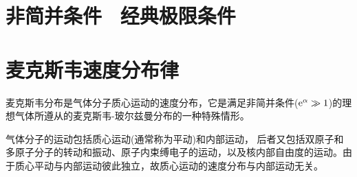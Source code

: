 \documentclass[12pt,a4paper]{article}
\begin{document}
\section{非简并条件 ~经典极限条件}






































\section{麦克斯韦速度分布律}
麦克斯韦分布是气体分子质心运动的速度分布，它是满足非简并条件(${\rm e}^\alpha \gg 1$)的理想气体所遵从的麦克斯韦-玻尔兹曼分布的一种特殊情形。

气体分子的运动包括质心运动(通常称为平动)和内部运动， 后者又包括双原子和多原子分子的转动和振动、原子内束缚电子的运动，以及核内部自由度的运动。由于质心平动与内部运动彼此独立，故质心运动的速度分布与内部运动无关。
\end{document}
